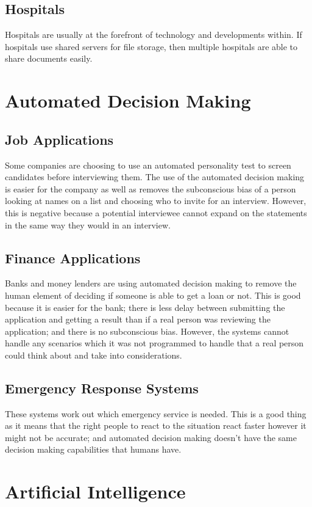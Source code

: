 \documentclass[a4paper,11pt, twocolumn]{article}
\begin{document}
\subsection{Hospitals}
Hospitals are usually at the forefront of technology and developments within. If hospitals use shared servers for file storage, then multiple hospitals are able to share documents easily.

\section{Automated Decision Making}
\subsection{Job Applications}
Some companies are choosing to use an automated personality test to screen candidates before interviewing them. The use of the automated decision making is easier for the company as well as  removes the subconscious bias of a person looking at names on a list and choosing who to invite for an interview. However, this is negative because a potential interviewee cannot expand on the statements in the same way they would in an interview.
\subsection{Finance Applications}
Banks and money lenders are using automated decision making to remove the human element of deciding if someone is able to get a loan or not. This is good because it is easier for the bank; there is less delay between submitting the application and getting a result than if a real person was reviewing the application; and there is no subconscious bias. However, the systems cannot handle any scenarios which it was not programmed to handle that a real person could think about and take into considerations.
\subsection{Emergency Response Systems}
These systems work out which emergency service is needed. This is a good thing as it means that the right people to react to the situation react faster however it might not be accurate; and automated decision making doesn't have the same decision making capabilities that humans have.

\section{Artificial Intelligence}
\end{document}
